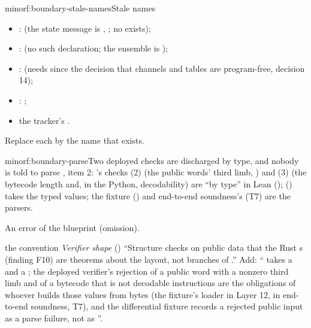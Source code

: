 \begin{finding}{minor}{f:boundary-stale-names}{Stale names}
\begin{itemize}
\item {}:  (the state message is , ;
  no  exists);
\item {}:  (no such declaration; the ensemble is
  );
\item {}:  (needs  since the decision
  that channels and tables are program-free, decision 14);
\item {}: ;
\item the tracker's .
\end{itemize}

 Replace each by the name that exists.
\end{finding}

\begin{finding}{minor}{f:boundary-parse}{Two deployed checks are discharged by type, and nobody is told to parse}
 , item 2: 's checks (2)
(the public words' third limb, ) and (3) (the bytecode length and, in the
Python, decodability) are \enquote{by type} in Lean ();
 () takes the typed values; the
fixture () and end-to-end soundness's (T7)  are the
parsers.

 An error of the blueprint (omission).

\begin{change}{the convention \emph{Verifier shape} ()}
\asis \enquote{Structure checks on public data that the Rust s (finding F10) are
theorems about the layout, not branches of .}
\asproposed Add: \enquote{ takes a  and a ; the
deployed verifier's rejection of a public word with a nonzero third limb and of a bytecode that is
not  decodable instructions are the obligations of whoever builds those values
from bytes (the fixture's loader in Layer 12,  in end-to-end soundness, T7), and the
differential fixture records a rejected public input as a parse failure, not as
}.
\end{change}
\end{finding}

